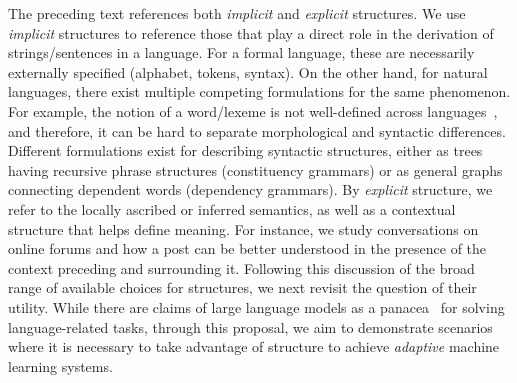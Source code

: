 The preceding text references both \textit{implicit} and \textit{explicit} structures. 
We use \textit{implicit} structures to reference those that play a direct role in the derivation of strings/sentences in a language.
For a formal language, these are necessarily externally specified (alphabet, tokens, syntax).
On the other hand, for natural languages, there exist multiple competing formulations for the same phenomenon.
For example, the notion of a word/lexeme is not well-defined across languages~\cite{martin2017indeterminacy}, and therefore, it can be hard to separate morphological and syntactic differences. 
Different formulations exist for describing syntactic structures, either as trees having recursive phrase structures (constituency grammars) or as general graphs connecting dependent words (dependency grammars).
By \textit{explicit} structure, we refer to the locally ascribed or inferred semantics, as well as a contextual structure that helps define meaning.
For instance, we study conversations on online forums and how a post can be better understood in the presence of the context preceding and surrounding it.
Following this discussion of the broad range of available choices for structures, we next revisit the question of their utility.
While there are claims of large language models as a panacea~\citep{bommasani2021foundationmodels} for solving language-related tasks, through this proposal, we aim to demonstrate scenarios where it is necessary to take advantage of structure to achieve \textit{adaptive} machine learning systems.
\



